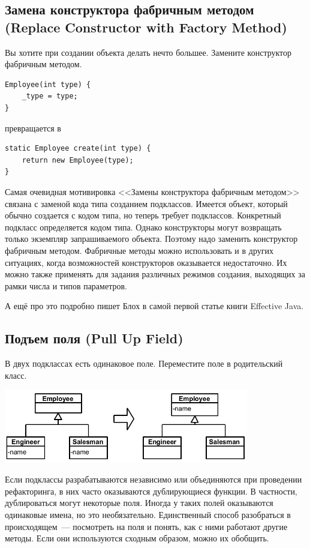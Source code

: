 \documentclass{../../text-style}
\begin{document}
\subsection{Замена конструктора фабричным методом (Replace Constructor with Factory Method)}

Вы хотите при создании объекта делать нечто большее. Замените конструктор фабричным методом.

\begin{verbatim}
Employee(int type) {
    _type = type;
}
\end{verbatim}

превращается в

\begin{verbatim}
static Employee create(int type) {
    return new Employee(type);
}
\end{verbatim}

Самая очевидная мотивировка <<Замены конструктора фабричным методом>> связана с заменой кода типа созданием подклассов. Имеется объект, который обычно создается с кодом типа, но теперь требует подклассов. Конкретный подкласс определяется кодом типа. Однако конструкторы могут возвращать только экземпляр запрашиваемого объекта. Поэтому надо заменить конструктор фабричным методом. Фабричные методы можно использовать и в других ситуациях, когда возможностей конструкторов оказывается недостаточно. Их можно также применять для задания различных режимов создания, выходящих за рамки числа и типов параметров.

А ещё про это подробно пишет Блох в самой первой статье книги Effective Java.

\subsection{Подъем поля (Pull Up Field)}

В двух подклассах есть одинаковое поле. Переместите поле в родительский класс.

\begin{center}
    \includegraphics[width=0.8\textwidth]{pullUpField.png}
\end{center}

Если подклассы разрабатываются независимо или объединяются при проведении рефакторинга, в них часто оказываются дублирующиеся функции. В частности, дублироваться могут некоторые поля. Иногда у таких полей оказываются одинаковые имена, но это необязательно. Единственный способ разобраться в происходящем~--- посмотреть на поля и понять, как с ними работают другие методы. Если они используются сходным образом, можно их обобщить.
\end{document}

